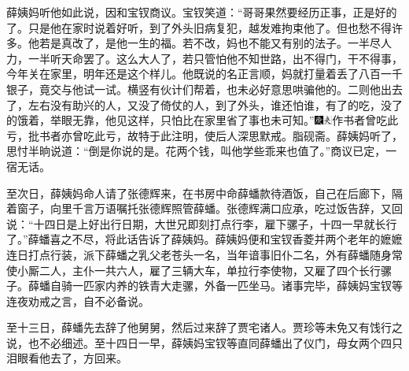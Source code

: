 薛姨妈听他如此说，因和宝钗商议。宝钗笑道：``哥哥果然要经历正事，正是好的了。只是他在家时说着好听，到了外头旧病复犯，越发难拘束他了。但也愁不得许多。他若是真改了，是他一生的福。若不改，妈也不能又有别的法子。一半尽人力，一半听天命罢了。这么大人了，若只管怕他不知世路，出不得门，干不得事，今年关在家里，明年还是这个样儿。他既说的名正言顺，妈就打量着丢了八百一千银子，竟交与他试一试。横竖有伙计们帮着，也未必好意思哄骗他的。二则他出去了，左右没有助兴的人，又没了倚仗的人，到了外头，谁还怕谁，有了的吃，没了的饿着，举眼无靠，他见这样，只怕比在家里省了事也未可知。''{\includegraphics[width=3mm]{../Images/00004}\includegraphics[width=3mm]{../Images/00012}\footnotesize \kaishu 作书者曾吃此亏，批书者亦曾吃此亏，故特于此注明，使后人深思默戒。脂砚斋。}薛姨妈听了，思忖半晌说道：``倒是你说的是。花两个钱，叫他学些乖来也值了。''商议已定，一宿无话。

至次日，薛姨妈命人请了张德辉来，在书房中命薛蟠款待酒饭，自己在后廊下，隔着窗子，向里千言万语嘱托张德辉照管薛蟠。张德辉满口应承，吃过饭告辞，又回说：``十四日是上好出行日期，大世兄即刻打点行李，雇下骡子，十四一早就长行了。''薛蟠喜之不尽，将此话告诉了薛姨妈。薛姨妈便和宝钗香菱并两个老年的嬷嬷连日打点行装，派下薛蟠之乳父老苍头一名，当年谙事旧仆二名，外有薛蟠随身常使小厮二人，主仆一共六人，雇了三辆大车，单拉行李使物，又雇了四个长行骡子。薛蟠自骑一匹家内养的铁青大走骡，外备一匹坐马。诸事完毕，薛姨妈宝钗等连夜劝戒之言，自不必备说。

至十三日，薛蟠先去辞了他舅舅，然后过来辞了贾宅诸人。贾珍等未免又有饯行之说，也不必细述。至十四日一早，薛姨妈宝钗等直同薛蟠出了仪门，母女两个四只泪眼看他去了，方回来。

